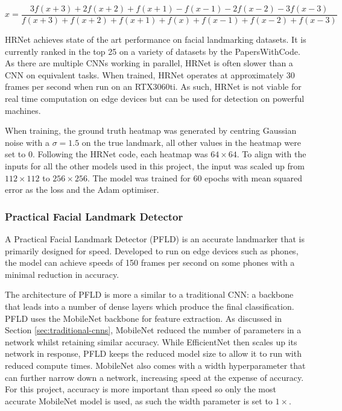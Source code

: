 \begin{equation}
    \label{eq:com7}
    \hat{x} = \frac{3f(x+3)+2f(x+2)+f(x+1)-f(x-1)-2f(x-2)-3f(x-3)}{f(x+3)+f(x+2)+f(x+1)+f(x)+f(x-1)+f(x-2)+f(x-3)}
\end{equation}

HRNet achieves state of the art performance on facial landmarking datasets. It is currently ranked in the top 25 on a variety of datasets by the PapersWithCode\cite{paperswithcodehrnet}. As there are multiple CNNs working in parallel, HRNet is often slower than a CNN on equivalent tasks. When trained, HRNet operates at approximately 30 frames per second when run on an RTX3060ti. As such, HRNet is not viable for real time computation on edge devices but can be used for detection on powerful machines.

When training, the ground truth heatmap was generated by centring Gaussian noise with a $\sigma=1.5$ on the true landmark, all other values in the heatmap were set to 0. Following the HRNet code\cite{zhao2019facial}, each heatmap was $64\times64$. To align with the inputs for all the other models used in this project, the input was scaled up from $112\times112$ to $256\times256$. The model was trained for 60 epochs with mean squared error as the loss and the Adam\cite{kingma2014adam} optimiser.

\subsubsection{Practical Facial Landmark Detector}


A Practical Facial Landmark Detector (PFLD)\cite{guo2019pfld} is an accurate landmarker that is primarily designed for speed. Developed to run on edge devices such as phones, the model can achieve speeds of 150 frames per second on some phones with a minimal reduction in accuracy.

The architecture of PFLD is more a similar to a traditional CNN: a backbone that leads into a number of dense layers which produce the final classification. PFLD uses the MobileNet backbone\cite{howard2017mobilenets} for feature extraction. As discussed in Section \ref{sec:traditional-cnns}, MobileNet reduced the number of parameters in a network whilst retaining similar accuracy. While EfficientNet then scales up its network in response, PFLD keeps the reduced model size to allow it to run with reduced compute times. MobileNet also comes with a width hyperparameter that can further narrow down a network, increasing speed at the expense of accuracy. For this project, accuracy is more important than speed so only the most accurate MobileNet model is used, as such the width parameter is set to $1\times$. 

